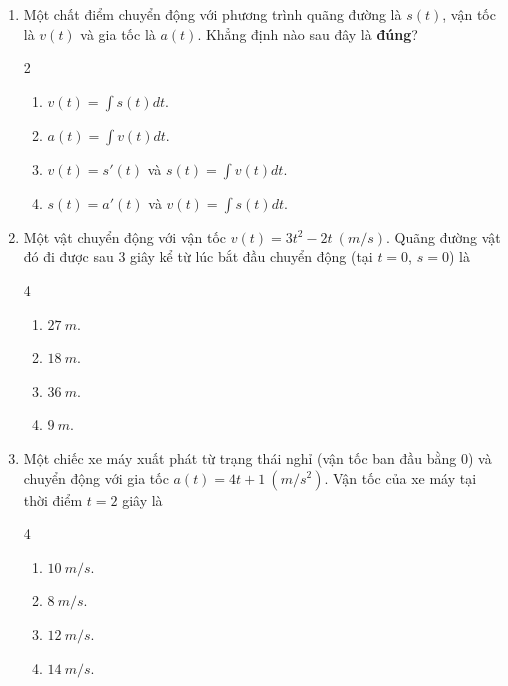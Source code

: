 \documentclass[12pt]{article}
\begin{document}
	\begin{enumerate}[label=\textbf{Câu \arabic*.}]
			
		\item Một chất điểm chuyển động với phương trình quãng đường là $s(t)$, vận tốc là $v(t)$ và gia tốc là $a(t)$. Khẳng định nào sau đây là \textbf{đúng}?
		\begin{multicols}{2}
			\begin{enumerate}[label=\textbf{\Alph*.}]
				\item $v(t) = \displaystyle \int s(t)dt$.
				\item $a(t) = \displaystyle \int v(t)dt$.
				\item $v(t) = s'(t)$ và $s(t) = \displaystyle \int v(t)dt$.
				\item $s(t) = a'(t)$ và $v(t) = \displaystyle \int s(t)dt$.
			\end{enumerate}
		\end{multicols}
		
		\item Một vật chuyển động với vận tốc $v(t) = 3t^2 - 2t \ (m/s)$. Quãng đường vật đó đi được sau $3$ giây kể từ lúc bắt đầu chuyển động (tại $t=0$, $s=0$) là
		\begin{multicols}{4}
			\begin{enumerate}[label=\textbf{\Alph*.}]
				\item $27 \ m$.
				\item $18 \ m$.
				\item $36 \ m$.
				\item $9 \ m$.
			\end{enumerate}
		\end{multicols}
		
		\item Một chiếc xe máy xuất phát từ trạng thái nghỉ (vận tốc ban đầu bằng $0$) và chuyển động với gia tốc $a(t) = 4t + 1 \ (m/s^2)$. Vận tốc của xe máy tại thời điểm $t = 2$ giây là
		\begin{multicols}{4}
			\begin{enumerate}[label=\textbf{\Alph*.}]
				\item $10 \ m/s$.
				\item $8 \ m/s$.
				\item $12 \ m/s$.
				\item $14 \ m/s$.
			\end{enumerate}
		\end{multicols}
		

\end{enumerate}
\end{document}
